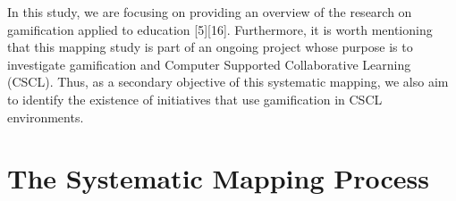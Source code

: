 In this study, we are focusing on providing an overview of the
research on gamification applied to education [5][16]. Furthermore,
it is worth mentioning that this mapping study is part of an ongoing
project whose purpose is to investigate gamification and Computer
Supported Collaborative Learning (CSCL). Thus, as a secondary
objective of this systematic mapping, we also aim to identify the
existence of initiatives that use gamification in CSCL
environments. 


\section{The Systematic Mapping Process}

